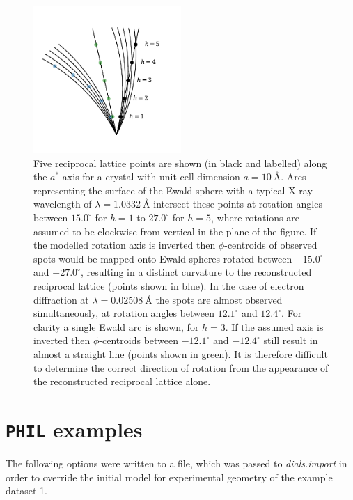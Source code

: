 \documentclass[preprint]{iucr}
\newcommand{\dialsimport}{\emph{dials.import}\xspace}
\newcommand{\code}{\texttt}
\begin{document}
\begin{figure}
  \label{fig:invert_axis}
  \centering
  \caption{
    Five reciprocal lattice points are shown (in black and labelled) along the
    $a^*$ axis for a crystal with unit cell dimension $a=\SI{10}{\angstrom}$.
    Arcs representing the surface of the Ewald sphere with a typical X-ray
    wavelength of $\lambda=\SI{1.0332}{\angstrom}$ intersect these points at
    rotation angles between $15.0^\circ$ for $h=1$ to $27.0^\circ$ for $h=5$,
    where rotations are assumed to be clockwise from vertical in the plane of
    the figure. If the modelled rotation axis is inverted then $\phi$-centroids
    of observed spots would be mapped onto Ewald spheres rotated between
    $-15.0^\circ$ and $-27.0^\circ$, resulting in a distinct curvature to the
    reconstructed reciprocal lattice (points shown in blue). In the case of
    electron diffraction at $\lambda=\SI{0.02508}{\angstrom}$ the spots are
    almost observed simultaneously, at rotation angles between $12.1^\circ$ and
    $12.4^\circ$. For clarity a single Ewald arc is shown, for $h=3$. If the
    assumed axis is inverted then $\phi$-centroids between $-12.1^\circ$ and
    $-12.4^\circ$ still result in almost a straight line (points shown in
    green). It is therefore difficult to determine the correct direction of
    rotation from the appearance of the reconstructed reciprocal lattice alone.
  }
  \includegraphics[width=0.5\textwidth]{Figures/relps_inverted_axis.pdf}
\end{figure}

\appendix

\section{\code{PHIL} examples \label{app:PHIL_example}}

The following options were written to a file, which was passed to \dialsimport
in order to override the initial model for experimental geometry of the example
dataset 1.
\end{document}
